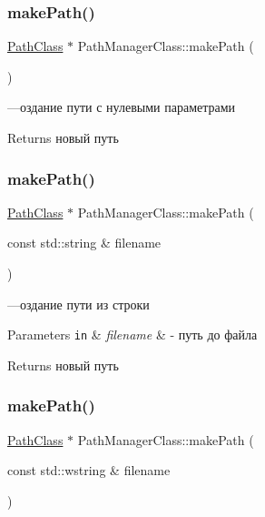 \subsubsection{\texorpdfstring{make\+Path()}{makePath()}\hspace{0.1cm}{\footnotesize\ttfamily [1/3]}}
{\footnotesize\ttfamily \hyperlink{class_path_class}{Path\+Class} $\ast$ Path\+Manager\+Class\+::make\+Path (\begin{DoxyParamCaption}{ }\end{DoxyParamCaption})}



—оздание пути с нулевыми параметрами 

\begin{DoxyReturn}{Returns}
новый путь 
\end{DoxyReturn}
\mbox{\label{class_path_manager_class_a88f48d8829e28eabd5550850e4066a79}} 
\subsubsection{\texorpdfstring{make\+Path()}{makePath()}\hspace{0.1cm}{\footnotesize\ttfamily [2/3]}}
{\footnotesize\ttfamily \hyperlink{class_path_class}{Path\+Class} $\ast$ Path\+Manager\+Class\+::make\+Path (\begin{DoxyParamCaption}\item[{const std\+::string \&}]{filename }\end{DoxyParamCaption})}



—оздание пути из строки 


\begin{DoxyParams}[1]{Parameters}
\mbox{\tt in}  & {\em filename} & -\/ путь до файла \\
\hline
\end{DoxyParams}
\begin{DoxyReturn}{Returns}
новый путь 
\end{DoxyReturn}
\mbox{\label{class_path_manager_class_aa48ba4bada896b5a4f28e62ad3bdb753}} 
\subsubsection{\texorpdfstring{make\+Path()}{makePath()}\hspace{0.1cm}{\footnotesize\ttfamily [3/3]}}
{\footnotesize\ttfamily \hyperlink{class_path_class}{Path\+Class} $\ast$ Path\+Manager\+Class\+::make\+Path (\begin{DoxyParamCaption}\item[{const std\+::wstring \&}]{filename }\end{DoxyParamCaption})}



